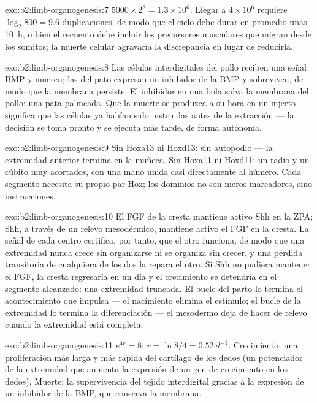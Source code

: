 \begin{solution}{exo:b2:limb-organogenesis:7}
$5000\times 2^{8} = 1.3\times 10^{6}$. Llegar a $4\times 10^{6}$ requiere
$\log_2 800 = 9.6$ duplicaciones, de modo que el ciclo debe durar en
promedio unas \qty{10}{h}, o bien el recuento debe incluir los
precursores musculares que migran desde los somitos; la muerte celular
agravaría la discrepancia en lugar de reducirla.
\end{solution}

\begin{solution}{exo:b2:limb-organogenesis:8}
Las células interdigitales del pollo reciben una señal BMP y mueren; las
del pato expresan un inhibidor de la BMP y sobreviven, de modo que la
membrana persiste. El inhibidor en una bola salva la membrana del pollo:
una pata palmeada. Que la muerte se produzca a su hora en un injerto
significa que las células ya habían sido instruidas antes de la
extracción --- la decisión se toma pronto y se ejecuta más tarde, de forma
autónoma.
\end{solution}

\begin{solution}{exo:b2:limb-organogenesis:9}
Sin Hoxa13 ni Hoxd13: sin autopodio --- la extremidad anterior termina en
la muñeca. Sin Hoxa11 ni Hoxd11: un radio y un cúbito muy acortados, con
una mano unida casi directamente al húmero. Cada segmento necesita su
propio par Hox; los dominios no son meros marcadores, sino instrucciones.
\end{solution}

\begin{solution}{exo:b2:limb-organogenesis:10}
El FGF de la cresta mantiene activo Shh en la ZPA; Shh, a través de un
relevo mesodérmico, mantiene activo el FGF en la cresta. La señal de cada
centro certifica, por tanto, que el otro funciona, de modo que una
extremidad nunca crece sin organizarse ni se organiza sin crecer, y una
pérdida transitoria de cualquiera de los dos la repara el otro. Si Shh
no pudiera mantener el FGF, la cresta regresaría en un día y el
crecimiento se detendría en el segmento alcanzado: una extremidad
truncada. El bucle del parto lo termina el acontecimiento que impulsa
--- el nacimiento elimina el estímulo; el bucle de la extremidad lo
termina la diferenciación --- el mesodermo deja de hacer de relevo cuando
la extremidad está completa.
\end{solution}

\begin{solution}{exo:b2:limb-organogenesis:11}
$e^{4r} = 8$: $r = \ln 8/4 = \qty{0.52}{d^{-1}}$. Crecimiento: una
proliferación más larga y más rápida del cartílago de los dedos (un
potenciador de la extremidad que aumenta la expresión de un gen de
crecimiento en los dedos). Muerte: la supervivencia del tejido
interdigital gracias a la expresión de un inhibidor de la BMP, que
conserva la membrana.
\end{solution}

